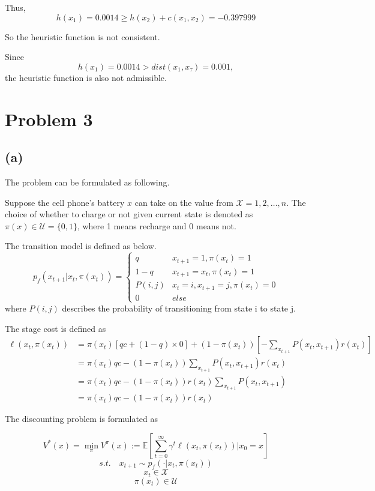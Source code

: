 \documentclass{article} %
\begin{document}
Thus, 
$$h(x_1) = 0.0014 \ge h(x_2) + c(x_1, x_2) = -0.397999$$

So the heuristic function is not consistent.

Since
$$ h(x_1) = 0.0014 > dist(x_1, x_{\tau}) = 0.001, $$
the heuristic function is also not admissible.


\section{Problem 3}
\subsection{(a)}

The problem can be formulated as following.

Suppose the cell phone's battery $x$ can take on the value from $\mathcal{X}={1,2,\dots, n}$. The choice of whether to charge or not given current state is denoted as $\pi(x) \in \mathcal{U} = \{0, 1\}$, where 1 means recharge and 0 means not.

The transition model is defined as below. 
$$p_{f}\left(x_{t+1} | x_{t}, \pi\left(x_{t}\right)\right)=
\begin{cases}
q& x_{t+1}=1, \pi(x_t)=1\\
1 - q & x_{t+1}=x_t, \pi(x_t)=1 \\
P(i, j) & x_t = i, x_{t+1}=j, \pi(x_t)=0 \\
0 & else
\end{cases}$$
where $P(i, j)$ describes the probability of transitioning from state i to state j.

The stage cost is defined as 
\begin{equation*}
    \begin{aligned}
        \ell (x_t, \pi(x_t)) &= \pi(x_t)[qc + (1-q)\times0] + (1-\pi(x_t))[-\sum_{x_{t+1}}P(x_t, x_{t+1})r(x_t)] \\
                &= \pi(x_t)qc - (1-\pi(x_t))\sum_{x_{t+1}}P(x_t, x_{t+1})r(x_t) \\
                &= \pi(x_t)qc - (1-\pi(x_t))r(x_t)\sum_{x_{t+1}}P(x_t, x_{t+1}) \\
                &= \pi(x_t)qc - (1-\pi(x_t))r(x_t)
    \end{aligned}
\end{equation*}

The discounting problem is formulated as

$$V^{*}(x)=\min _{\pi} V^{\pi}(x) :=\mathbb{E}\left[\sum_{t=0}^{\infty} \gamma^{t} \ell\left(x_{t}, \pi\left(x_{t}\right)\right) | x_{0}=x\right]$$
$$s.t. \quad x_{t+1} \sim p_{f}\left(\cdot | x_{t}, \pi\left(x_{t}\right)\right)$$
$$x_{t} \in \mathcal{X}$$
$$\pi\left(x_{t}\right) \in \mathcal{U}$$
\end{document}
